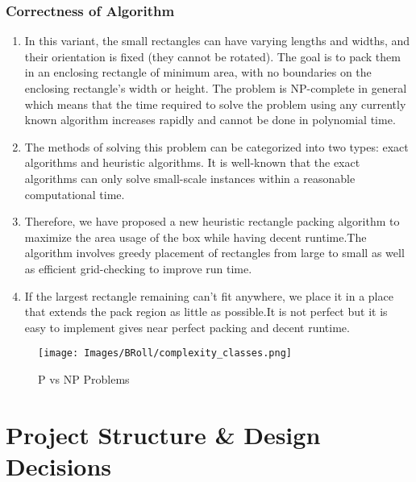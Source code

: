 \documentclass[12pt, a4paper,openany]{article}
\begin{document}
\subsubsection{Correctness of Algorithm}
\begin{enumerate}
    \item In this variant, the small rectangles can have varying lengths and widths, and their orientation is fixed (they cannot be rotated). The goal is to pack them in an enclosing rectangle of minimum area, with no boundaries on the enclosing rectangle's width or height. The problem is NP-complete in general which means that the time required to solve the problem using any currently known algorithm increases rapidly and cannot be done in polynomial time.
    \item The methods of solving this problem can be categorized into two types: exact algorithms and heuristic algorithms. It is well-known that the exact algorithms can only solve small-scale instances within a reasonable computational time. 
    \item Therefore, we have proposed a new heuristic rectangle packing algorithm to maximize the area usage of the box while having decent runtime.The algorithm involves greedy placement of rectangles from large to small as well as efficient grid-checking to improve run time.
    \item If the largest rectangle remaining can't fit anywhere, we place it in a place that extends the pack region as little as possible.It is not perfect but it is easy to implement gives near perfect packing and decent runtime. 
\end{enumerate}
\newpage %
\begin{figure}[ht]
    \centering
    \begin{minipage}{.5\textwidth}
          \centering
          \texttt{[image: Images/BRoll/complexity\_classes.png]}
          \label{fig:4bit-res1_sb}
          \caption{P vs NP Problems }
      
          
      \end{minipage}
\end{figure}

\section{Project Structure \& Design Decisions}
\end{document}
